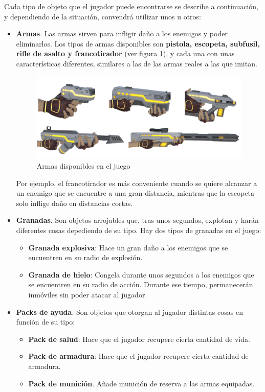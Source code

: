 Cada tipo de objeto que el jugador puede encontrarse se describe a continuación, y dependiendo de la situación, convendrá utilizar unos u otros:
\begin{itemize}
    \item \textbf{Armas}. Las armas sirven para infligir daño a los enemigos y poder eliminarlos. Los tipos de armas disponibles son \textbf{pistola, escopeta, subfusil, rifle de asalto y francotirador} (ver figura \ref{fig:Armas}), y cada una con unas características diferentes, similares a las de las armas reales a las que imitan.\\
    
    \begin{figure}[h]
    \centering
    \includegraphics[scale=0.45]{img/WeaponSet.png}
    \caption{Armas disponibles en el juego}
    \label{fig:Armas}
    \end{figure}
    
    Por ejemplo, el francotirador es más conveniente cuando se quiere alcanzar a un enemigo que se encuentre a una gran distancia, mientras que la escopeta solo inflige daño en distancias cortas.
    \item \textbf{Granadas}. Son objetos arrojables que, tras unos segundos, explotan y harán diferentes cosas depediendo de su tipo. Hay dos tipos de granadas en el juego:
    \begin{itemize}
        \item \textbf {Granada explosiva}: Hace un gran daño a los enemigos que se encuentren en su radio de explosión.
        \item \textbf {Granada de hielo}: Congela durante unos segundos a los enemigos que se encuentren en su radio de acción. Durante ese tiempo, permanecerán inmóviles sin poder atacar al jugador.
    \end{itemize}
    \item \textbf{Packs de ayuda}. Son objetos que otorgan al jugador distintas cosas en función de su tipo:
    \begin{itemize}
        \item \textbf {Pack de salud}: Hace que el jugador recupere cierta cantidad de vida.
        \item \textbf {Pack de armadura}: Hace que el jugador recupere cierta cantidad de armadura.
        \item \textbf{Pack de munición}. Añade munición de reserva a las armas equipadas.
    \end{itemize}
\end{itemize}
